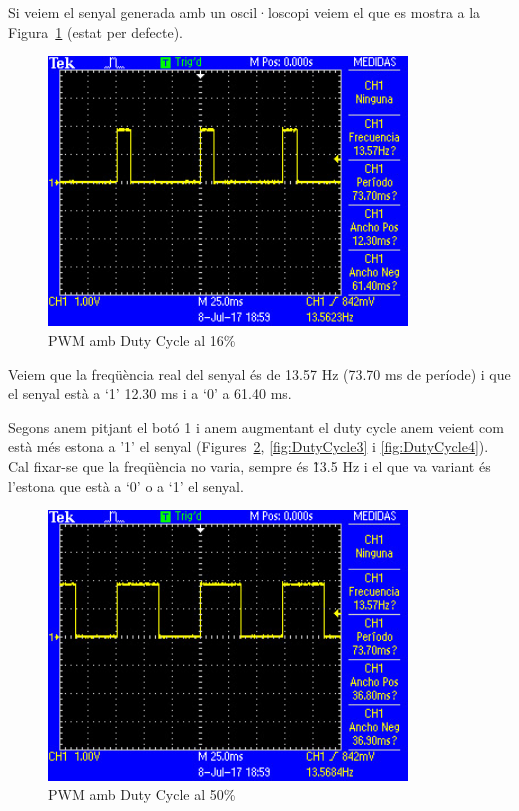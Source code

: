 Si veiem el senyal generada amb un oscil·loscopi veiem el que es mostra a la Figura~\ref{fig:DutyCycle1} (estat per defecte).
\begin{figure}
 \centering
 \includegraphics[width=0.85\textwidth, keepaspectratio]{imatges/DutyCycle1.png}
 \caption{PWM amb Duty Cycle al 16\%}
 \label{fig:DutyCycle1}
\end{figure}

Veiem que la freqüència real del senyal és de 13.57 Hz (73.70 ms de període) i que el senyal està a ‘1' 12.30 ms i a ‘0' a 61.40 ms.

Segons anem pitjant el botó 1 i anem augmentant el \gls{duty cycle} anem veient com està més estona a '1' el senyal (Figures~\ref{fig:DutyCycle2},
\ref{fig:DutyCycle3} i \ref{fig:DutyCycle4}).
Cal fixar-se que la freqüència no varia, sempre és \~13.5 Hz i el que va variant és l'estona que està a ‘0' o a ‘1' el senyal.

\begin{figure}
 \centering
 \includegraphics[width=0.85\textwidth, keepaspectratio]{imatges/DutyCycle2.png}
 \caption{PWM amb Duty Cycle al 50\%}
 \label{fig:DutyCycle2}
\end{figure}

